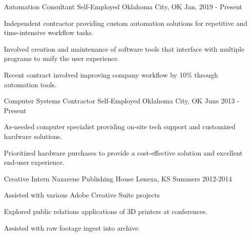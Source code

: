 

\begin{cventries}

\cventry
{Automation Consultant} %
{Self-Employed} %
{Oklahoma City, OK} %
{Jan. 2019 - Present} %
{
	\begin{cvitems} %
		\item {Independent contractor providing custom automation solutions for repetitive and time-intensive workflow tasks.}
		\item {Involved creation and maintenance of software tools that interface with multiple programs to unify the user experience.}
		\item{Recent contract involved improving company workflow by 10\% through automation tools.}
	\end{cvitems}
}

\cventry
{Computer Systems Contractor} %
{Self-Employed} %
{Oklahoma City, OK} %
{June 2013 - Present} %
{
	\begin{cvitems} %
		\item {As-needed computer specialist providing on-site tech support and customized hardware solutions.}
		\item{Prioritized hardware purchases to provide a cost-effective solution and excellent end-user experience.}
	\end{cvitems}
}

\cventry
{Creative Intern} %
{Nazarene Publishing House} %
{Lenexa, KS} %
{Summers 2012-2014} %
{
	\begin{cvitems} %
		\item{Assisted with various Adobe Creative Suite projects}
		\item{Explored public relations applications of 3D printers at conferences.}
		\item{Assisted with raw footage ingest into archive.}
	\end{cvitems}
}


\end{cventries}
